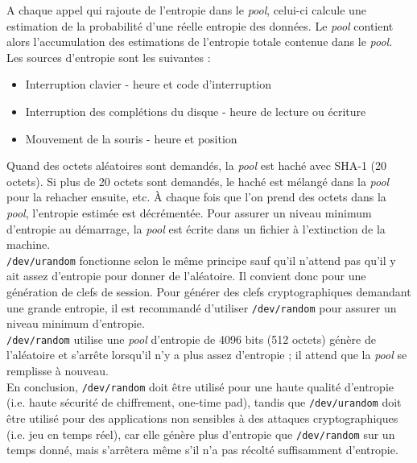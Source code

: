 			A chaque appel qui rajoute de l'entropie dans le \textit{pool}, celui-ci calcule une estimation de la probabilité d'une réelle entropie des données. Le \textit{pool} contient alors l'accumulation des estimations de l'entropie totale contenue dans le \textit{pool}.\\
						
			Les sources d'entropie sont les suivantes :
			\begin{itemize}
			\item Interruption clavier - heure et code d'interruption 
			\item Interruption des complétions du disque - heure de lecture ou écriture
			\item Mouvement de la souris - heure et position\\
			\end{itemize}
			
			Quand des octets aléatoires sont demandés, la \textit{pool} est haché avec SHA-1 (20 octets). Si plus de 20 octets sont demandés, le haché est mélangé dans la \textit{pool} pour la rehacher ensuite, etc. À chaque fois que l'on prend des octets dans la \textit{pool}, l'entropie estimée est décrémentée. Pour assurer un niveau minimum d'entropie au démarrage, la \textit{pool} est écrite dans un fichier à l'extinction de la machine.\\
			
			\texttt{/dev/urandom} fonctionne selon le même principe sauf qu'il n'attend pas qu'il y ait assez d'entropie pour donner de l'aléatoire. Il convient donc pour une génération de clefs de session. Pour générer des clefs cryptographiques demandant une grande entropie, il est recommandé d'utiliser \texttt{/dev/random} pour assurer un niveau minimum d'entropie.\\
			
			\texttt{/dev/random} utilise une \textit{pool} d'entropie de 4096 bits (512 octets) génère de l'aléatoire et s'arrête lorsqu'il n'y a plus assez d'entropie ; il attend que la \textit{pool} se remplisse à nouveau.\\
			
			En conclusion, \texttt{/dev/random} doit être utilisé pour une haute qualité d'entropie (i.e. haute sécurité de chiffrement, one-time pad), tandis que \texttt{/dev/urandom} doit être utilisé pour des applications non sensibles à des attaques cryptographiques (i.e. jeu en temps réel), car elle génère plus d'entropie que \texttt{/dev/random} sur un temps donné, mais s'arrêtera même s'il n'a pas récolté suffisamment d'entropie.\\

